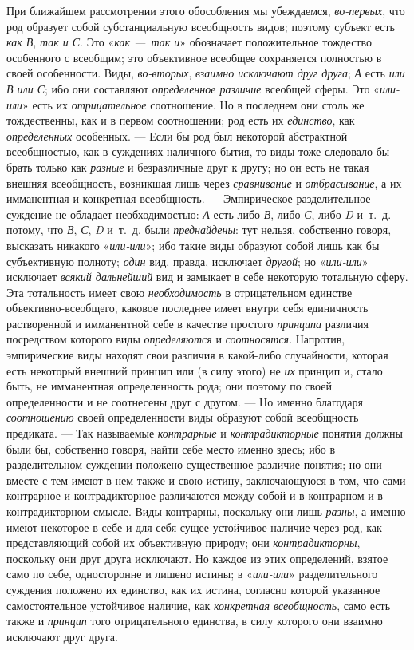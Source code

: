 \documentclass[twoside]{article}
\begin{document}
{{При ближайшем рассмотрении этого обособления мы убеждаемся,
{\em во-первых}, что род
образует собой субстанциальную всеобщность видов; поэтому субъект есть
{\em как В},
{\em так и С}. Это
«{\em как —~так и}»
обозначает положительное тождество особенного с всеобщим; это
объективное всеобщее сохраняется полностью в своей особенности. Виды,
{\em во-вторых},
{\em взаимно исключают друг друга};
{\em А} есть
{\em или В или С}; ибо
они составляют {\em определенное
различие} всеобщей сферы. Это
«{\em или-или}» есть их
{\em отрицательное}
соотношение. Но в последнем они столь же тождественны, как и
в первом соотношении; род есть их
{\em единство}, как
{\em определенных}
особенных. — Если бы род был некоторой
абстрактной всеобщностью, как в суждениях наличного бытия, то виды тоже
следовало бы брать только как
{\em разные} и
безразличные друг к другу; но он есть не такая внешняя всеобщность,
возникшая лишь через {\em сравнивание}
и {\em отбрасывание},
а их имманентная и конкретная всеобщность. —
Эмпирическое разделительное суждение не обладает
необходимостью: {\em А}
есть либо {\em В},
либо {\em С},
либо {\em D} и~т.~д.
потому, что {\em В},
{\em С}, {\em D}
и~т.~д. были
{\em преднайдены}: тут
нельзя, собственно говоря, высказать никакого
«{\em или-или}»; ибо
такие виды образуют собой лишь как бы субъективную полноту;
{\em один} вид, правда,
исключает {\em другой};
но «{\em или-или}»
исключает {\em всякий
дальнейший} вид и замыкает в себе некоторую тотальную сферу.
Эта тотальность имеет свою
{\em необходимость} в
отрицательном единстве объективно-всеобщего, каковое последнее имеет внутри
себя единичность растворенной и имманентной себе в качестве простого
{\em принципа} различия
посредством которого виды
{\em определяются} и
{\em соотносятся}.
Напротив, эмпирические виды находят свои различия в
какой-либо случайности, которая есть некоторый внешний принцип или (в силу
этого) не {\em их}
принцип и, стало быть, не имманентная определенность рода;
они поэтому по своей определенности и не соотнесены друг с другом. —
Но именно благодаря
{\em соотношению} своей
определенности виды образуют собой всеобщность предиката. —
Так называемые
{\em контрарные} и
{\em контрадикторные}
понятия должны были бы, собственно говоря, найти себе место
именно здесь; ибо в разделительном суждении положено существенное различие
понятия; но они вместе с тем имеют в нем также и свою истину, заключающуюся
в том, что сами контрарное и контрадикторное различаются между собой и в
контрарном и в контрадикторном смысле. Виды контрарны, поскольку они лишь
{\em разны}, а именно
имеют некоторое в-себе-и-для-себя-сущее устойчивое наличие через род, как
представляющий собой их объективную природу; они
{\em контрадикторны},
поскольку они друг друга исключают. Но каждое из этих
определений, взятое само по себе, односторонне и лишено истины; в
«{\em или-или}»
разделительного суждения положено их единство, как их истина,
согласно которой указанное самостоятельное устойчивое наличие, как
{\em конкретная всеобщность},
само есть также и
{\em принцип} того
отрицательного единства, в силу которого они взаимно исключают друг
друга.

}}
\end{document}
